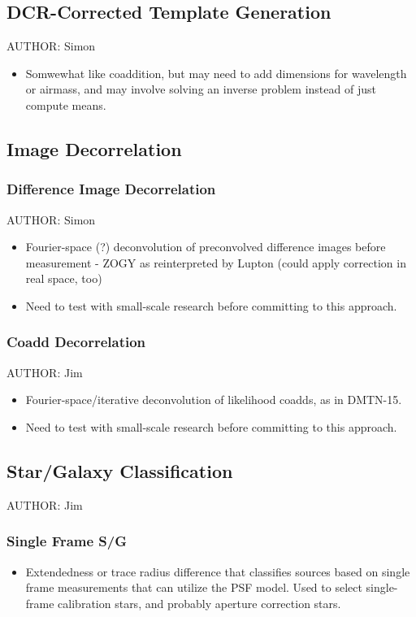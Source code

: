 \subsection{DCR-Corrected Template Generation}
\label{sec:acDCRTemplates}
AUTHOR: Simon
\begin{itemize}
\item Somwewhat like coaddition, but may need to add dimensions for wavelength or airmass, and may involve solving an inverse problem instead of just compute means.
\end{itemize}

\subsection{Image Decorrelation}
\label{sec:acImageDecorrelation}
\subsubsection{Difference Image Decorrelation}
\label{sec:acDiffImDecorrelation}
AUTHOR: Simon
\begin{itemize}
\item Fourier-space (?) deconvolution of preconvolved difference images before measurement - ZOGY as reinterpreted by Lupton (could apply correction in real space, too)
\item Need to test with small-scale research before committing to this approach.
\end{itemize}

\subsubsection{Coadd Decorrelation}
\label{sec:acCoaddDecorrelation}
AUTHOR: Jim
\begin{itemize}
\item Fourier-space/iterative deconvolution of likelihood coadds, as in DMTN-15.
\item Need to test with small-scale research before committing to this approach.
\end{itemize}

\subsection{Star/Galaxy Classification}
\label{sec:acClassification}
AUTHOR: Jim
\subsubsection{Single Frame S/G}
\label{sec:acSingleFrameClassification}
\begin{itemize}
\item Extendedness or trace radius difference that classifies sources based on single frame measurements that can utilize the PSF model.  Used to select single-frame calibration stars, and probably aperture correction stars.
\end{itemize}
